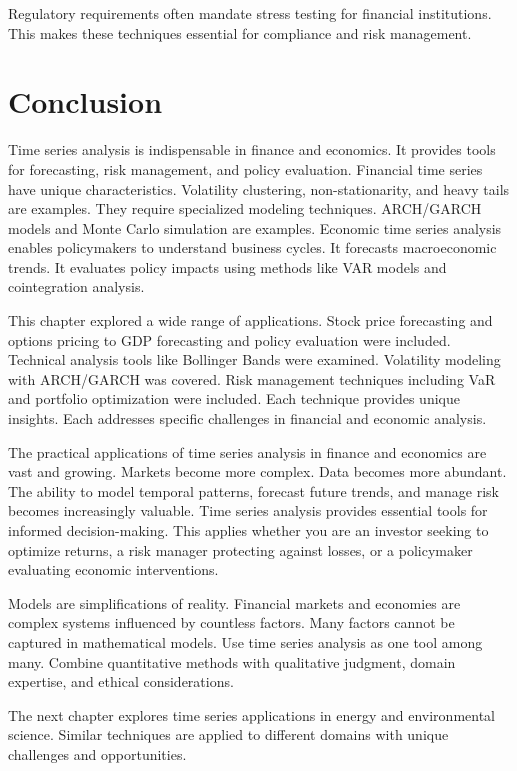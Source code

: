 Regulatory requirements often mandate stress testing for financial institutions. This makes these techniques essential for compliance and risk management.

\section{Conclusion}

Time series analysis is indispensable in finance and economics. It provides tools for forecasting, risk management, and policy evaluation. Financial time series have unique characteristics. Volatility clustering, non-stationarity, and heavy tails are examples. They require specialized modeling techniques. ARCH/GARCH models and Monte Carlo simulation are examples. Economic time series analysis enables policymakers to understand business cycles. It forecasts macroeconomic trends. It evaluates policy impacts using methods like VAR models and cointegration analysis.

This chapter explored a wide range of applications. Stock price forecasting and options pricing to GDP forecasting and policy evaluation were included. Technical analysis tools like Bollinger Bands were examined. Volatility modeling with ARCH/GARCH was covered. Risk management techniques including VaR and portfolio optimization were included. Each technique provides unique insights. Each addresses specific challenges in financial and economic analysis.

The practical applications of time series analysis in finance and economics are vast and growing. Markets become more complex. Data becomes more abundant. The ability to model temporal patterns, forecast future trends, and manage risk becomes increasingly valuable. Time series analysis provides essential tools for informed decision-making. This applies whether you are an investor seeking to optimize returns, a risk manager protecting against losses, or a policymaker evaluating economic interventions.

Models are simplifications of reality. Financial markets and economies are complex systems influenced by countless factors. Many factors cannot be captured in mathematical models. Use time series analysis as one tool among many. Combine quantitative methods with qualitative judgment, domain expertise, and ethical considerations.

The next chapter explores time series applications in energy and environmental science. Similar techniques are applied to different domains with unique challenges and opportunities.

